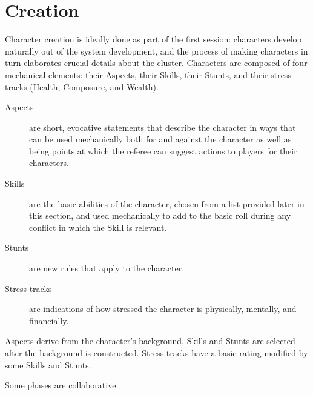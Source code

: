 \section{Creation}



Character creation is ideally done as part of the first session: characters develop naturally out of the system development, and the process of making characters in turn elaborates crucial details about the cluster. Characters are composed of four mechanical elements: their Aspects, their Skills, their Stunts, and their stress tracks (Health, Composure, and Wealth).

\begin{description}
\item[Aspects] %
are short, evocative statements that describe the character in ways that can be used mechanically both for and against the character as well as being points at which the referee can suggest actions to players for their characters.

\item[Skills]
are the basic abilities of the character, chosen from a list provided later in this section, and used mechanically to add to the basic roll during any conflict in which the Skill is relevant.

\item[Stunts]
are new rules that apply to the character.

\item[Stress tracks]
are indications of how stressed the character is physically, mentally, and financially.
\end{description}

Aspects derive from the character's background. Skills and Stunts are selected after the background is constructed. Stress tracks have a basic rating modified by some Skills and Stunts.

Some phases are collaborative.

